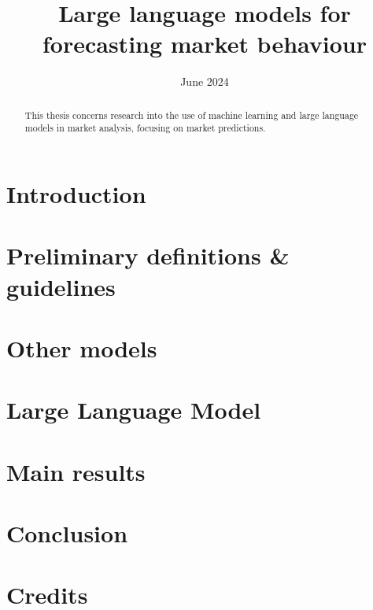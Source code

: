 \documentclass[licencjacka, en]{pracamgr}
\title{Large language models for forecasting market behaviour}
\date{June 2024}
\begin{document}
\newcommand{\rozdzial}[2]{
	\chapter{#1}
	\label{chap:#2}
	
}

\maketitle

\begin{abstract}
	This thesis concerns research into the use of machine learning
	and large language models in market analysis, focusing on market
	predictions.
\end{abstract}

\tableofcontents

\rozdzial{Introduction}{introduction}
\rozdzial{Preliminary definitions \& guidelines}{preliminary-definitions}
\rozdzial{Other models}{other-models}
\rozdzial{Large Language Model}{large-language-model}
\rozdzial{Main results}{results}
\rozdzial{Conclusion}{conclusion}
\rozdzial{Credits}{credits}
% 

\end{document}
